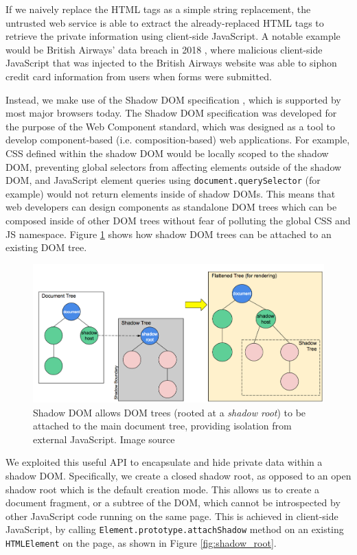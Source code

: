 \documentclass[letterpaper,twocolumn,10pt]{article}
\begin{document}
If we naively replace the HTML tags as a simple string replacement, the untrusted web service is able to extract the already-replaced HTML tags to retrieve the private information using client-side JavaScript. A notable example would be British Airways' data breach in 2018 \cite{Ng:2018}, where malicious client-side JavaScript that was injected to the British Airways website was able to siphon credit card information from users when forms were submitted.

Instead, we make use of the Shadow DOM specification \cite{Bidelman}, which is supported by most major browsers today. The Shadow DOM specification was developed for the purpose of the Web Component standard, which was designed as a tool to develop component-based (i.e. composition-based) web applications. For example, CSS defined within the shadow DOM would be locally scoped to the shadow DOM, preventing global selectors from affecting elements outside of the shadow DOM, and JavaScript element queries using \texttt{document.querySelector} (for example) would not return elements inside of shadow DOMs. This means that web developers can design components as standalone DOM trees which can be composed inside of other DOM trees without fear of polluting the global CSS and JS namespace. Figure \ref{fig:shadow_dom} shows how shadow DOM trees can be attached to an existing DOM tree.

\begin{figure}[]
    \centering
    \includegraphics[width=\columnwidth]{png/shadow-dom.png}
    \caption{Shadow DOM allows DOM trees (rooted at a \textit{shadow root}) to be attached to the main document tree, providing isolation from external JavaScript. Image source \cite{UsingShadowDOM}}
    \label{fig:shadow_dom}
\end{figure}

We exploited this useful API to encapsulate and hide private data within a shadow DOM. Specifically, we create a closed shadow root, as opposed to an open shadow root which is the default creation mode. This allows us to create a document fragment, or a subtree of the DOM, which cannot be introspected by other JavaScript code running on the same page. This is achieved in client-side JavaScript, by calling \texttt{Element.prototype.attachShadow} method on an existing \texttt{HTMLElement} on the page, as shown in Figure \ref{fig:shadow_root}.
\end{document}
